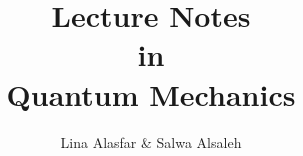 \documentclass[a4paper,12pt]{book}
\begin{document}
\author{Lina Alasfar \& Salwa Alsaleh}
\title{Lecture Notes\\in\\ Quantum Mechanics}
\date{}

\frontmatter
\maketitle
\tableofcontents

\mainmatter
	
	
	
	
	
	
	
	
	
	
\appendix
	
	
\backmatter
	\nocite{*}
	
	
\end{document}
